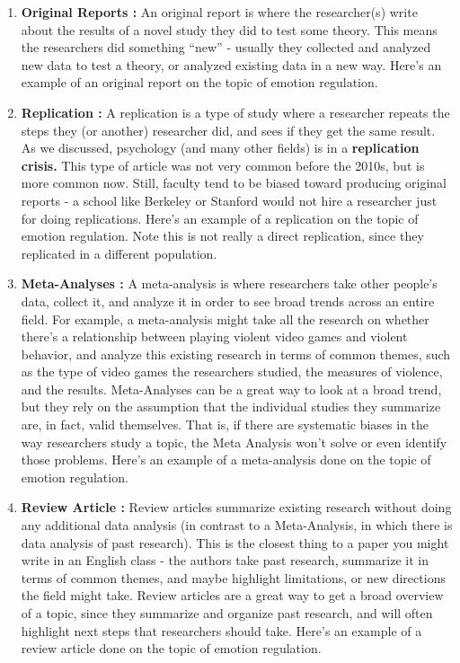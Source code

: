 \documentclass[
  letterpaper,
  DIV=11,
  numbers=noendperiod,
  oneside]{scrreprt}
\begin{document}
\begin{enumerate}
\def\labelenumi{\arabic{enumi}.}
\item
  \textbf{Original Reports :} An original report is where the
  researcher(s) write about the results of a novel study they did to
  test some theory. This means the researchers did something ``new'' -
  usually they collected and analyzed new data to test a theory, or
  analyzed existing data in a new way. Here's an example of an original
  report on the topic of emotion regulation.
\item
  \textbf{Replication :} A replication is a type of study where a
  researcher repeats the steps they (or another) researcher did, and
  sees if they get the same result. As we discussed, psychology (and
  many other fields) is in a \textbf{replication crisis.} This type of
  article was not very common before the 2010s, but is more common now.
  Still, faculty tend to be biased toward producing original reports - a
  school like Berkeley or Stanford would not hire a researcher just for
  doing replications. Here's an example of a replication on the topic of
  emotion regulation. Note this is not really a direct replication,
  since they replicated in a different population.
\item
  \textbf{Meta-Analyses :} A meta-analysis is where researchers take
  other people's data, collect it, and analyze it in order to see broad
  trends across an entire field. For example, a meta-analysis might take
  all the research on whether there's a relationship between playing
  violent video games and violent behavior, and analyze this existing
  research in terms of common themes, such as the type of video games
  the researchers studied, the measures of violence, and the results.
  Meta-Analyses can be a great way to look at a broad trend, but they
  rely on the assumption that the individual studies they summarize are,
  in fact, valid themselves. That is, if there are systematic biases in
  the way researchers study a topic, the Meta Analysis won't solve or
  even identify those problems. Here's an example of a meta-analysis
  done on the topic of emotion regulation.
\item
  \textbf{Review Article :} Review articles summarize existing research
  without doing any additional data analysis (in contrast to a
  Meta-Analysis, in which there is data analysis of past research). This
  is the closest thing to a paper you might write in an English class -
  the authors take past research, summarize it in terms of common
  themes, and maybe highlight limitations, or new directions the field
  might take. Review articles are a great way to get a broad overview of
  a topic, since they summarize and organize past research, and will
  often highlight next steps that researchers should take. Here's an
  example of a review article done on the topic of emotion regulation.
\end{enumerate}
\end{document}
